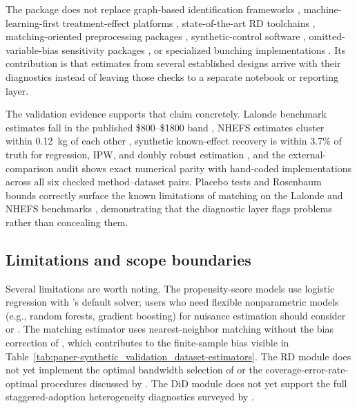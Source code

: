 \documentclass[article]{jss}
\begin{document}
The package does not replace graph-based
identification frameworks \citep{Pearl2009,SharmaKiciman2020},
machine-learning-first treatment-effect platforms
\citep{BattocchiEtAl2019,BachEtAl2022,ChenEtAl2020},
state-of-the-art RD toolchains
\citep{CalonicoEtAl2015,CattaneoIdroboTitiunik2020,CattaneoTitiunik2022},
matching-oriented preprocessing packages \citep{HoImaiKingStuart2011},
synthetic-control software \citep{AbadieDiamondHainmueller2011},
omitted-variable-bias sensitivity packages
\citep{CinelliFerwerdaHazlett2020}, or specialized bunching implementations
\citep{MavrokonstantisLockwood2020}. Its contribution is that estimates
from several established designs arrive with their diagnostics instead of
leaving those checks to a separate notebook or reporting layer.

The validation evidence supports that claim concretely. Lalonde benchmark
estimates fall in the published \$800--\$1800 band
\citep{Lalonde1986,DehejiaWahba1999}, NHEFS estimates cluster within
0.12~kg of each other \citep{HernanRobins2020}, synthetic known-effect
recovery is within 3.7\% of truth for regression, IPW, and doubly robust
estimation \citep{FunkEtAl2011}, and the external-comparison audit shows
exact numerical parity with hand-coded implementations across all six
checked method--dataset pairs. Placebo tests and Rosenbaum bounds correctly
surface the known limitations of matching on the Lalonde and NHEFS
benchmarks \citep{Rosenbaum2002,VanderWeeleDing2017}, demonstrating that
the diagnostic layer flags problems rather than concealing them.

\subsection{Limitations and scope boundaries}\label{sec:limitations}

Several limitations are worth noting. The propensity-score models use
logistic regression with 's default solver; users who need
flexible nonparametric models (e.g., random forests, gradient boosting) for
nuisance estimation should consider  or 
\citep{BattocchiEtAl2019,BachEtAl2022}. The matching estimator uses
nearest-neighbor matching without the bias correction of
\citet{AbadieImbens2006}, which contributes to the finite-sample bias
visible in Table~\ref{tab:paper-synthetic_validation_dataset-estimators}.
The RD module does not yet implement the optimal bandwidth selection of
\citet{CalonicoCattaneoFarrell2020} or the coverage-error-rate-optimal
procedures discussed by \citet{CattaneoTitiunik2022}. The DiD module does
not yet support the full staggered-adoption heterogeneity diagnostics
surveyed by \citet{RothEtAl2023}.
\end{document}
